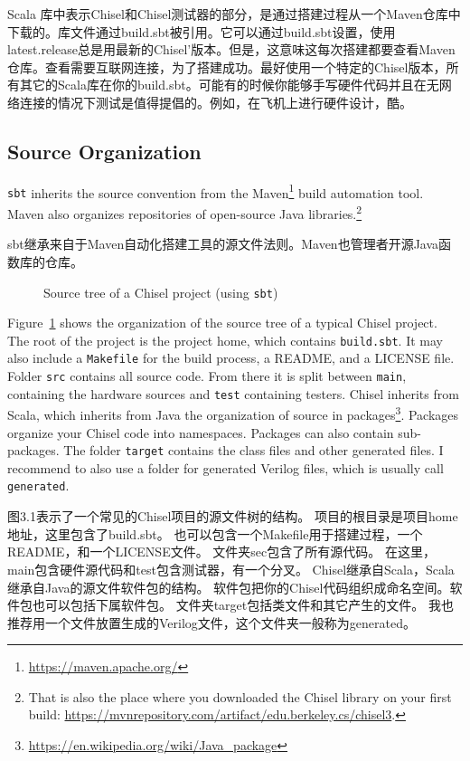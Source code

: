 \documentclass[%
    10pt,
    headinclude, footexclude,
    openright, %
    notitlepage,
    cleardoubleempty,
    headsepline,
    pointlessnumbers,
    bibtotoc, idxtotoc,
    ]{scrbook}
\newcommand{\code}[1]{{\small{\texttt{#1}}}}
\newcommand{\myref}[2]{\href{#1}{#2}}
\renewcommand{\myref}[2]{{#2}{\footnote{\url{#1}}}}
\begin{document}
Scala 库中表示Chisel和Chisel测试器的部分，是通过搭建过程从一个Maven仓库中下载的。库文件通过build.sbt被引用。它可以通过build.sbt设置，使用latest.release总是用最新的Chisel'版本。但是，这意味这每次搭建都要查看Maven仓库。查看需要互联网连接，为了搭建成功。最好使用一个特定的Chisel版本，所有其它的Scala库在你的build.sbt。可能有的时候你能够手写硬件代码并且在无网络连接的情况下测试是值得提倡的。例如，在飞机上进行硬件设计，酷。


\subsection{Source Organization}

\code{sbt} inherits the source convention from the \myref{https://maven.apache.org/}{Maven}
build automation tool. Maven also organizes repositories of open-source Java libraries.\footnote{That is
also the place where you downloaded the Chisel library on your first build:
\url{https://mvnrepository.com/artifact/edu.berkeley.cs/chisel3}.}

sbt继承来自于Maven自动化搭建工具的源文件法则。Maven也管理者开源Java函数库的仓库。

\begin{figure}
\caption{Source tree of a Chisel project (using \code{sbt})}
\label{fig:folders}
\end{figure}

Figure~\ref{fig:folders} shows the organization of the source tree of a typical Chisel project.
The root of the project is the project home, which contains \code{build.sbt}.
It may also include a \code{Makefile} for the build process, a README, and a LICENSE file.
Folder \code{src} contains all source code. From there it is split between \code{main},
containing the hardware sources and \code{test} containing testers.
Chisel inherits from Scala, which inherits from Java the organization of source
in \myref{https://en.wikipedia.org/wiki/Java_package}{packages}.
Packages organize your Chisel code into namespaces. Packages can also contain
sub-packages.
The folder \code{target} contains the class files and other generated files.
I recommend to also use a folder for generated Verilog files, which is usually
call \code{generated}.

图3.1表示了一个常见的Chisel项目的源文件树的结构。
项目的根目录是项目home地址，这里包含了build.sbt。
也可以包含一个Makefile用于搭建过程，一个README，和一个LICENSE文件。
文件夹sec包含了所有源代码。
在这里，main包含硬件源代码和test包含测试器，有一个分叉。
Chisel继承自Scala，Scala继承自Java的源文件软件包的结构。
软件包把你的Chisel代码组织成命名空间。软件包也可以包括下属软件包。
文件夹target包括类文件和其它产生的文件。
我也推荐用一个文件放置生成的Verilog文件，这个文件夹一般称为generated。
\end{document}
